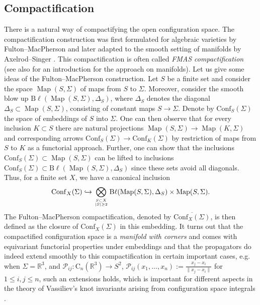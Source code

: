 \documentclass[11pt,colorinlistoftodos]{amsart}
\numberwithin{equation}{subsection}
\theoremstyle{plain}
\theoremstyle{definition}
\theoremstyle{remark}
\newcommand{\R}{\mathbb{R}}
\DeclareMathOperator{\Map}{Map}
\begin{document}
\subsection{Compactification}
There is a natural way of compactifying the open configuration space. The compactification construction was first formulated for algebraic varieties by Fulton--MacPherson \cite{FulMacPh} and later adapted to the smooth setting of manifolds by Axelrod--Singer \cite{AS,AS2}. This compactification is often called \emph{FMAS compactification} (see also \cite{Sinha2004} for an introduction for the approach on manifolds). 
Let us give some ideas of the Fulton--MacPherson construction. Let $S$ be a finite set and consider the space $\Map(S,\Sigma)$ of maps from $S$ to $\Sigma$. Moreover, consider the smooth blow up $\mathrm{B}\ell (\Map(S,\Sigma),\Delta_S)$, where $\Delta_S$ denotes the diagonal $\Delta_S\subset\Map(S,\Sigma)$, consisting of constant maps $S\to \Sigma$. Denote by $\mathrm{Conf}_S(\Sigma)$ the space of embeddings of $S$ into $\Sigma$. One can then observe that for every inclusion $K\subset S$ there are natural projections $\Map(S,\Sigma)\to \Map(K,\Sigma)$ and corresponding arrows $\mathrm{Conf}_S(\Sigma)\to \mathrm{Conf}_K(\Sigma)$ by restriction of maps from $S$ to $K$ as a functorial approach. Further, one can show that the inclusions $\mathrm{Conf}_S(\Sigma)\subset \Map(S,\Sigma)$ can be lifted to inclusions $\mathrm{Conf}_S(\Sigma)\subset \mathrm{B}\ell (\Map(S,\Sigma),\Delta_S)$ since these sets avoid all diagonals. Thus, for a finite set $X$, we have a canonical inclusion 
\[
\mathrm{Conf}_X(\Sigma)\hookrightarrow \bigotimes_{S\subset X\atop \vert S\vert\geq2}\mathrm{B}\ell (\Map(S,\Sigma),\Delta_S)\times \Map(S,\Sigma).
\]
The Fulton--MacPherson compactification, denoted by $\overline{\mathrm{Conf}_{X}(\Sigma)}$, is then defined as the closure of $\mathrm{Conf}_X(\Sigma)$ in this embedding.
It turns out that the compactified configuration space is a \emph{manifold with corners} and comes with equivariant functorial properties under embeddings and that the propagators do indeed extend smoothly to this compactification in certain important cases, e.g. when $\Sigma=\R^3$, and $\mathscr{P}_{ij}\colon \mathrm{C}_n(\R^3)\to S^2$, $\mathscr{P}_{ij}(x_1,\ldots,x_n):=\frac{x_j-x_i}{\|x_j-x_i\|}$ for $1\leq i,j\leq n$, such an extensions holds, which is important for different aspects in the theory of Vassiliev's knot invariants arising from configuration space integrals \cite{Kontsevich1993_2,Kontsevich1994,Bott1996,BC}.
\end{document}
